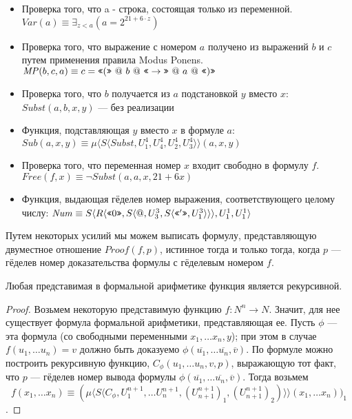 \begin{itemize}
\item Проверка того, что a - строка, состоящая только из переменной.
$\mathit{Var}(a) \equiv \exists_{z < a} (a = 2 ^ {21 + 6\cdot z})$

\item Проверка того, что выражение с номером $a$ получено из выражений $b$ и $c$ 
путем применения правила Modus Ponens.
$\mathit{MP} (b,c,a) \equiv c = \texttt{<<}(\texttt{>>} ~@~ b ~@~ \texttt{<<}\rightarrow\texttt{>>} ~@~ a ~@~ \texttt{<<})\texttt{>>}$

\item Проверка того, что $b$ получается из $a$ подстановкой $y$ вместо $x$:
$\mathit{Subst} (a,b,x,y)$ --- без реализации

\item Функция, подставляющая $y$ вместо $x$ в формуле $a$:\\
$\mathit{Sub} (a,x,y) \equiv \mu \langle{}S\langle{}\mathit{Subst},U^4_1,U^4_4,U^4_2,U^4_3\rangle\rangle(a,x,y)$

\item Проверка того, что переменная номер $x$ входит свободно в формулу $f$.\\
$\mathit{Free} (f,x) \equiv \neg \mathit{Subst}(a,a,x,21 + 6x)$

\item Функция, выдающая гёделев номер выражения, соответствующего целому числу:
$\mathit{Num} \equiv S\langle{}R\langle{}\texttt{<<}0\texttt{>>},S\langle{}@,U^3_3,S\langle{}\texttt{<<}'\texttt{>>},U^3_1\rangle{}\rangle{}\rangle,U^1_1,U^1_1\rangle{}$

\end{itemize}

Путем некоторых усилий мы можем выписать формулу, представляющую
двуместное отношение $\mathit{Proof}(f,p)$, истинное тогда и только тогда, когда
$p$ --- гёделев номер доказательства формулы с гёделевым номером $f$.

\begin{theorem}
Любая представимая в формальной арифметике функция является рекурсивной.
\end{theorem}
\begin{proof}
Возьмем некоторую представимую функцию $f: N^n \rightarrow N$. Значит, для нее существует
формула формальной арифметики, представляющая ее. Пусть $\phi$ --- эта формула
(со свободными переменными $x_1, \dots x_n, y$); при этом в случае 
$f(u_1, \dots u_n) = v$ должно быть доказуемо $\phi(\overline{u_1}, \dots \overline{u_n}, \overline{v})$.
По формуле можно построить рекурсивную функцию, $C_\phi (u_1, \dots u_n, v, p)$, 
выражающую тот факт, что $p$ --- гёделев номер вывода формулы 
$\phi(\overline{u_1}, \dots \overline{u_n}, \overline{v})$. Тогда 
возьмем $$f (x_1, \dots x_n) \equiv (\mu \langle{}S\langle{}C_\phi,U^{n+1}_1,\dots U^{n+1}_n,(U^{n+1}_{n+1})_1, (U^{n+1}_{n+1})_2)\rangle\rangle (x_1, \dots x_n))_1$$.
\end{proof}
